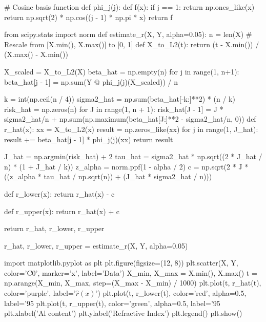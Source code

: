 \begin{python}
# Cosine basis function
def phi_{j}(j):
    def f(x):
        if j == 1:
            return np.ones_like(x)
        return np.sqrt(2) * np.cos((j - 1) * np.pi * x)
    return f
\end{python}

\begin{python}
from scipy.stats import norm
def estimate_r(X, Y, alpha=0.05):
    n = len(X)
    # Rescale from [X.min(), X.max()] to [0, 1]
    def X_to_L2(t):
        return (t - X.min()) / (X.max() - X.min())
    
    X_scaled = X_to_L2(X)
    beta_hat = np.empty(n)
    for j in range(1, n+1):
        beta_hat[j - 1] = np.sum(Y @ phi_{j}(j)(X_scaled)) / n
        
    k = int(np.ceil(n / 4))
    sigma2_hat = np.sum(beta_hat[-k:]**2) * (n / k)
    risk_hat = np.zeros(n)
    for J in range(1, n + 1):
        risk_hat[J - 1] = J * sigma2_hat/n 
                          + np.sum(np.maximum(beta_hat[J:]**2 
                          - sigma2_hat/n, 0))
    def r_hat(x):
        xx = X_to_L2(x)
        result = np.zeros_like(xx)
        for j in range(1, J_hat):
            result += beta_hat[j - 1] * phi_{j}(j)(xx)
        return result
        
    J_hat = np.argmin(risk_hat) + 2
    tau_hat = sigma2_hat * np.sqrt((2 * J_hat / n) * (1 + J_hat / k))
    z_alpha = norm.ppf(1 - alpha / 2)
    c = np.sqrt(2 * J * ((z_alpha * tau_hat / np.sqrt(n)) + (J_hat * sigma2_hat / n)))
    
    def r_lower(x):
        return r_hat(x) - c
    
    def r_upper(x):
        return r_hat(x) + c
            
    return r_hat, r_lower, r_upper
\end{python}

\begin{python}
r_hat, r_lower, r_upper = estimate_r(X, Y, alpha=0.05)
\end{python}

\begin{python}
import matplotlib.pyplot as plt
plt.figure(figsize=(12, 8))
plt.scatter(X, Y, color='C0', marker='x', label='Data')
X_min, X_max = X.min(), X.max()
t = np.arange(X_min, X_max, step=(X_max - X_min) / 1000)
plt.plot(t, r_hat(t), color='purple', label='$\hat{r}(x)$')
plt.plot(t, r_lower(t), color='red', alpha=0.5, label='95%
plt.plot(t, r_upper(t), color='green', alpha=0.5, label='95%
plt.xlabel('Al content')
plt.ylabel('Refractive Index')
plt.legend()
plt.show()
\end{python}

